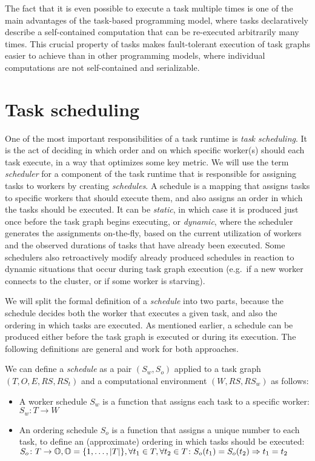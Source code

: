 The fact that it is even possible to execute a task multiple times is one of the main advantages of
the task-based programming model, where tasks declaratively describe a self-contained computation
that can be re-executed arbitrarily many times. This crucial property of tasks makes fault-tolerant
execution of task graphs easier to achieve than in other programming models, where individual
computations are not self-contained and serializable.

\section{Task scheduling}
\label{sec:task-scheduling}
One of the most important responsibilities of a task runtime is \emph{task scheduling}. It is the
act of deciding in which order and on which specific worker(s) should each task execute, in a way
that optimizes some key metric. We will use the term \emph{scheduler} for a component of the
task runtime that is responsible for assigning tasks to workers by creating \emph{schedules}.
A schedule is a mapping that assigns tasks to specific workers that should execute them, and also
assigns an order in which the tasks should be executed. It can be \emph{static}, in which
case it is produced just once before the task graph begins executing, or \emph{dynamic},
where the scheduler generates the assignments on-the-fly, based on the current utilization of
workers and the observed durations of tasks that have already been executed. Some schedulers also
retroactively modify already produced schedules in reaction to dynamic situations that occur during
task graph execution (e.g.\ if a new worker connects to the cluster, or if some worker is
starving).

We will split the formal definition of a \emph{schedule} into two parts, because the
schedule decides both the worker that executes a given task, and also the ordering in which tasks
are executed. As mentioned earlier, a schedule can be produced either before the task graph is
executed or during its execution. The following definitions are general and work for both
approaches.

We can define a \emph{schedule} as a pair $(S_w, S_o)$ applied to a task graph
$(T, O, E, RS, RS_t)$ and a computational environment $(W, RS, RS_w)$ as follows:

\begin{itemize}[itemsep=0pt]
	\item A worker schedule $S_w$ is a function that assigns each task to a specific worker:
	      \\ $S_w\colon T \rightarrow W$
	\item An ordering schedule $S_o$ is a function that assigns a unique number to each
	      task, to define an (approximate) ordering in which tasks should be executed: \\
	      $S_o\colon T \rightarrow \mathbb{O}, \mathbb{O} = \{1,\ldots,|T|\},
		      \forall t_1\in{}T, \forall t_2\in{}T\colon S_o(t_1) = S_o(t_2) \Rightarrow t_1 = t_2$
\end{itemize}

